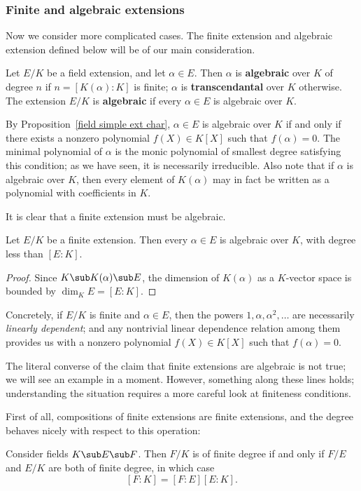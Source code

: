 \subsubsection{Finite and algebraic extensions}
Now we consider more complicated cases. The finite extension and algebraic extension defined below will be of our main consideration. 
\begin{definition}
Let $E/K$ be a field extension, and let $\alpha\in E$. Then $\alpha$ is \textbf{algebraic} over $K$ of degree $n$ if $n=[K(\alpha):K]$ is finite; $\alpha$ is \textbf{transcendantal} over $K$ otherwise. The extension $E/K$ is \textbf{algebraic} if every $\alpha\in E$ is algebraic over $K$.
\end{definition}
By Proposition~\ref{field simple ext char}, $\alpha\in E$ is algebraic over $K$ if and only if there exists a nonzero polynomial $f(X)\in K[X]$ such that $f(\alpha)=0$. The minimal polynomial of $\alpha$ is the monic polynomial of smallest degree satisfying this condition; as we have seen, it is necessarily irreducible. Also note that if $\alpha$ is algebraic over $K$, then every element of $K(\alpha)$ may in fact
be written as a polynomial with coefficients in $K$.\par
It is clear that a finite extension must be algebraic.
\begin{proposition}\label{field extension finite is algebraic}
Let $E/K$ be a finite extension. Then every $\alpha\in E$ is algebraic over $K$, with degree less than $[E:K]$.
\end{proposition}
\begin{proof}
Since $K\sub K(\alpha)\sub E$, the dimension of $K(\alpha)$ as a $K$-vector space is bounded by $\dim_KE=[E:K]$.
\end{proof}
Concretely, if $E/K$ is finite and $\alpha\in E$, then the powers $1,\alpha,\alpha^2,\dots$ are necessarily \textit{linearly dependent}; and any nontrivial linear dependence relation among them provides us with a nonzero polynomial $f(X)\in K[X]$ such that $f(\alpha)=0$.\par
The literal converse of the claim that finite extensions are algebraic is not true; we will see an example in a moment. However, something along these lines holds; understanding the situation requires a more careful look at finiteness conditions.\par
First of all, compositions of finite extensions are finite extensions, and the degree behaves nicely with respect to this operation:
\begin{proposition}\label{field ext degree multiplicative}
Consider fields $K\sub E\sub F$. Then $F/K$ is of finite degree if and only if $F/E$ and $E/K$ are both of finite degree, in which case
\[[F:K]=[F:E][E:K].\]
\end{proposition}
